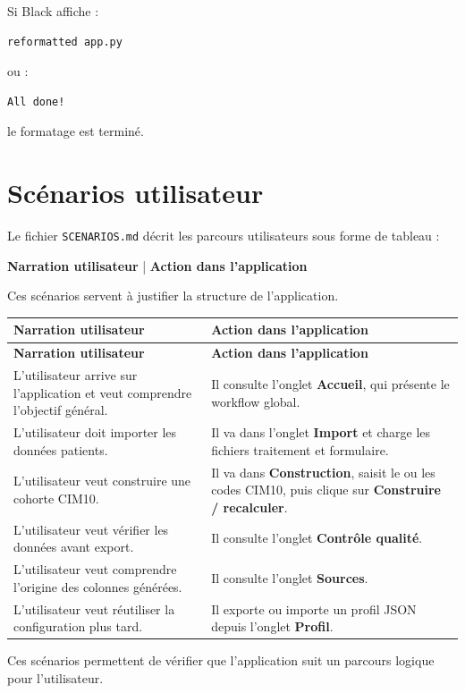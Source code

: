 \documentclass[11pt,a4paper]{article}
\begin{document}
Si Black affiche :

\begin{lstlisting}
reformatted app.py
\end{lstlisting}

ou :

\begin{lstlisting}
All done!
\end{lstlisting}

le formatage est terminé.

\section{Scénarios utilisateur}

Le fichier \texttt{SCENARIOS.md} décrit les parcours utilisateurs sous forme de
tableau :

\begin{center}
\textbf{Narration utilisateur} \quad | \quad \textbf{Action dans l'application}
\end{center}

Ces scénarios servent à justifier la structure de l'application.

\begin{longtable}{|p{}|p{}|}
\hline
\rowcolor{lightblue}
\textbf{Narration utilisateur} & \textbf{Action dans l'application} \\
\hline
\endfirsthead

\hline
\rowcolor{lightblue}
\textbf{Narration utilisateur} & \textbf{Action dans l'application} \\
\hline
\endhead

L'utilisateur arrive sur l'application et veut comprendre l'objectif général.
&
Il consulte l'onglet \textbf{Accueil}, qui présente le workflow global.
\\
\hline

L'utilisateur doit importer les données patients.
&
Il va dans l'onglet \textbf{Import} et charge les fichiers traitement et formulaire.
\\
\hline

L'utilisateur veut construire une cohorte CIM10.
&
Il va dans \textbf{Construction}, saisit le ou les codes CIM10, puis clique sur
\textbf{Construire / recalculer}.
\\
\hline

L'utilisateur veut vérifier les données avant export.
&
Il consulte l'onglet \textbf{Contrôle qualité}.
\\
\hline

L'utilisateur veut comprendre l'origine des colonnes générées.
&
Il consulte l'onglet \textbf{Sources}.
\\
\hline

L'utilisateur veut réutiliser la configuration plus tard.
&
Il exporte ou importe un profil JSON depuis l'onglet \textbf{Profil}.
\\
\hline

\end{longtable}

Ces scénarios permettent de vérifier que l'application suit un parcours logique
pour l'utilisateur.
\end{document}
